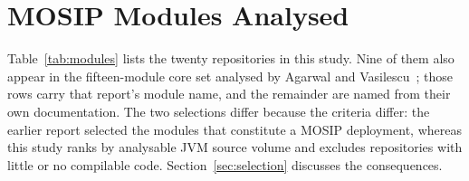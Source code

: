 %
%

\appendix

\section{MOSIP Modules Analysed}
\label{app:modules}

Table~\ref{tab:modules} lists the twenty repositories in this study. Nine of
them also appear in the fifteen-module core set analysed by Agarwal and
Vasilescu~\cite{agarwal2025mosip}; those rows carry that report's module name,
and the remainder are named from their own documentation. The two selections
differ because the criteria differ: the earlier report selected the modules
that constitute a MOSIP deployment, whereas this study ranks by analysable JVM
source volume and excludes repositories with little or no compilable code.
Section~\ref{sec:selection} discusses the consequences.

